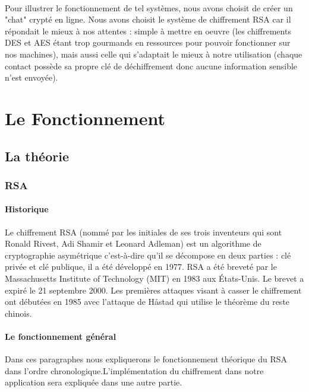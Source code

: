 \documentclass[12pt,a4paper]{report}
\begin{document}
\paragraph{}

Pour illustrer le fonctionnement de tel systèmes, nous avons choisit de créer un "chat" crypté en ligne. Nous avons choisit le système de chiffrement RSA car il répondait le mieux à nos attentes : simple à mettre en oeuvre (les chiffrements DES et AES étant trop gourmands en ressources pour pouvoir fonctionner sur nos machines), mais aussi celle qui s’adaptait le mieux à notre utilisation (chaque contact possède sa propre clé de déchiffrement donc aucune information sensible n’est envoyée).  



\part{Le Fonctionnement}
\chapter{La théorie}
\section{RSA}
\subsection{Historique}
Le chiffrement RSA (nommé par les initiales de ses trois inventeurs qui sont Ronald Rivest, Adi Shamir et Leonard Adleman) est un algorithme de cryptographie asymétrique c'est-à-dire qu'il se décompose en deux parties : clé privée et clé publique, il a été développé en 1977. RSA a été breveté par le Massachusetts Institute of Technology (MIT) en 1983 aux États-Unis. Le brevet a expiré le 21 septembre 2000. Les premières attaques visant à casser le chiffrement ont débutées en 1985 avec l'attaque de Håstad qui utilise le théorème du reste chinois.
\subsection{Le fonctionnement général}
Dans ces paragraphes nous expliquerons le fonctionnement théorique du RSA dans l'ordre chronologique.L'implémentation du chiffrement dans notre application sera expliquée dans une autre partie.
\end{document}
